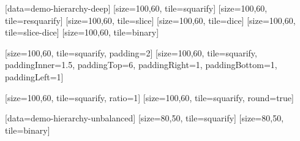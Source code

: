 \documentclass{article}
\begin{document}
[data=demo-hierarchy-deep]
[size={100,60}, tile=squarify]
[size={100,60}, tile=resquarify]
[size={100,60}, tile=slice]
[size={100,60}, tile=dice]
[size={100,60}, tile=slice-dice]
[size={100,60}, tile=binary]

[size={100,60}, tile=squarify, padding=2]
[size={100,60}, tile=squarify,
  paddingInner=1.5, paddingTop=6, paddingRight=1, paddingBottom=1, paddingLeft=1]

[size={100,60}, tile=squarify, ratio=1]
[size={100,60}, tile=squarify, round=true]

[data=demo-hierarchy-unbalanced]
[size={80,50}, tile=squarify]
[size={80,50}, tile=binary]
\end{document}
